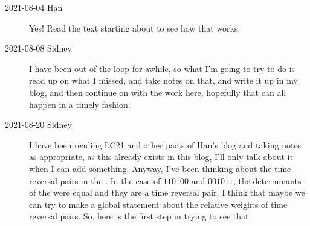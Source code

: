 \begin{description}
\item[2021-08-04 Han] Yes!
Read the text starting about
 to see how that works.

\item[2021-08-08 Sidney]
I have been out of the loop for awhile, so what I'm going to try to do is read up on what I missed, and take notes on that, and write it up in my blog, and then continue on with the work here, hopefully that can all happen in a timely fashion.

\item[2021-08-20 Sidney]
I have been reading LC21 and other parts of Han's blog and taking notes as appropriate, as this already exists in this blog, I'll only talk about it when I can add something. Anyway, I've been thinking about the time reversal pairs in the {\henlatt}. In the case of $110100$ and $001011$, the determinants of the  {\jacobianOrbs} were equal and they are a time reversal pair. I think that maybe we can try to make a global statement about the relative weights of time reversal pairs. So, here is the first step in trying to see that.


\end{description}
